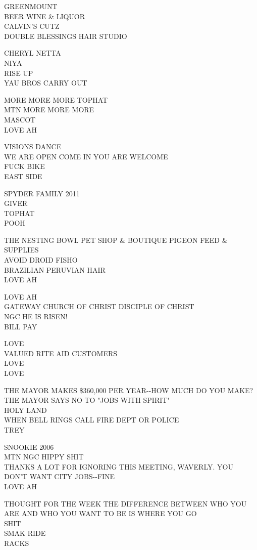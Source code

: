 \documentclass[10pt,letterpaper]{article}
\begin{document}
GREENMOUNT\\
BEER WINE \& LIQUOR\\
CALVIN'S CUTZ\\
DOUBLE BLESSINGS HAIR STUDIO

CHERYL NETTA\\
NIYA\\
RISE UP\\
YAU BROS CARRY OUT

MORE MORE MORE TOPHAT\\
MTN MORE MORE MORE\\
MASCOT\\
LOVE AH

VISIONS DANCE\\
WE ARE OPEN COME IN YOU ARE WELCOME\\
FUCK BIKE\\
EAST SIDE

SPYDER FAMILY 2011\\
GIVER\\
TOPHAT\\
POOH

THE NESTING BOWL PET SHOP \& BOUTIQUE PIGEON FEED \& SUPPLIES\\
AVOID DROID FISHO\\
BRAZILIAN PERUVIAN HAIR\\
LOVE AH

LOVE AH\\
GATEWAY CHURCH OF CHRIST DISCIPLE OF CHRIST\\
NGC HE IS RISEN!\\
BILL PAY

LOVE\\
VALUED RITE AID CUSTOMERS\\
LOVE\\
LOVE

THE MAYOR MAKES \$360,000 PER YEAR{-}{-}HOW MUCH DO YOU MAKE?  THE MAYOR SAYS NO TO "JOBS WITH SPIRIT"\\
HOLY LAND\\
WHEN BELL RINGS CALL FIRE DEPT OR POLICE\\
TREY

SNOOKIE 2006\\
MTN NGC HIPPY SHIT\\
THANKS A LOT FOR IGNORING THIS MEETING, WAVERLY.  YOU DON'T WANT CITY JOBS{-}{-}FINE\\
LOVE AH

THOUGHT FOR THE WEEK THE DIFFERENCE BETWEEN WHO YOU ARE AND WHO YOU WANT TO BE IS WHERE YOU GO\\
SHIT\\
SMAK RIDE\\
RACKS
\end{document}
